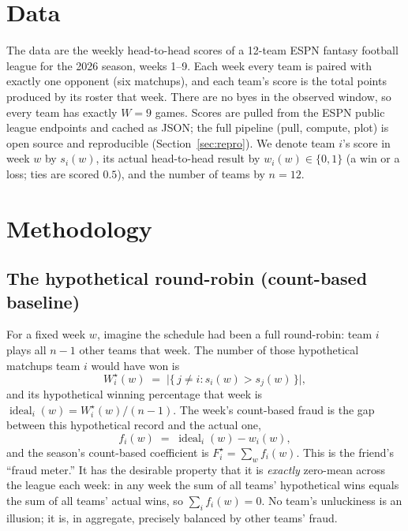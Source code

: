 \documentclass[11pt]{article}
\begin{document}
\section{Data}
\label{sec:data}

The data are the weekly head-to-head scores of a 12-team ESPN fantasy
football league for the 2026 season, weeks 1--9. Each week every team is
paired with exactly one opponent (six matchups), and each team's score is the
total points produced by its roster that week. There are no byes in the
observed window, so every team has exactly $W=9$ games. Scores are pulled from
the ESPN public league endpoints and cached as JSON; the full pipeline
(pull, compute, plot) is open source and reproducible
(Section~\ref{sec:repro}). We denote team $i$'s score in week $w$ by
$s_i(w)$, its actual head-to-head result by $w_i(w)\in\{0,1\}$ (a win or a
loss; ties are scored $0.5$), and the number of teams by $n=12$.

\section{Methodology}
\label{sec:method}

\subsection{The hypothetical round-robin (count-based baseline)}
\label{sec:baseline}

For a fixed week $w$, imagine the schedule had been a full round-robin: team
$i$ plays all $n-1$ other teams that week. The number of those hypothetical
matchups team $i$ would have won is
\begin{equation}
W_i^{\star}(w) \;=\; \bigl|\{\,j\neq i : s_i(w) > s_j(w)\,\}\bigr|,
\end{equation}
and its hypothetical winning percentage that week is
$\operatorname{ideal}_i(w) = W_i^{\star}(w)/(n-1)$. The week's count-based
fraud is the gap between this hypothetical record and the actual one,
\begin{equation}
f_i(w) \;=\; \operatorname{ideal}_i(w) - w_i(w),
\end{equation}
and the season's count-based coefficient is $F_i^{\star}=\sum_w f_i(w)$. This
is the friend's ``fraud meter.'' It has the desirable property that it is
\emph{exactly} zero-mean across the league each week: in any week the sum of
all teams' hypothetical wins equals the sum of all teams' actual wins, so
$\sum_i f_i(w)=0$. No team's unluckiness is an illusion; it is, in aggregate,
precisely balanced by other teams' fraud.
\end{document}
